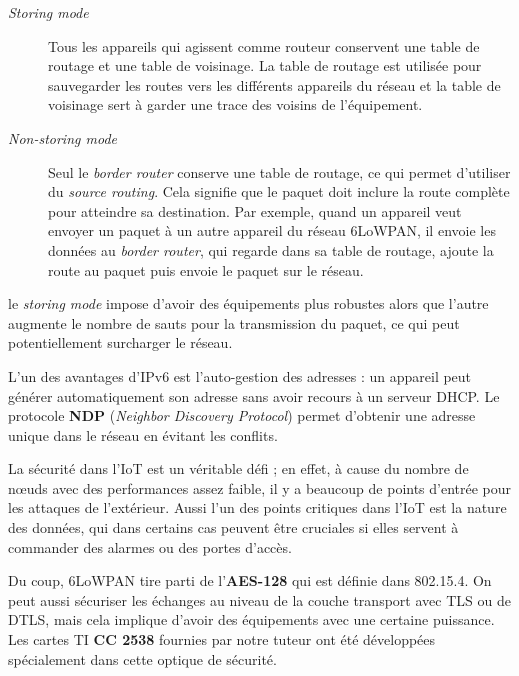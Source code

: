\begin{description}
	\item[\textit{Storing mode}] Tous les appareils qui agissent comme routeur conservent une table de routage et une table de voisinage. La table de routage est utilisée pour sauvegarder les routes vers les différents appareils du réseau et la table de voisinage sert à garder une trace des voisins de l'équipement.
	\item[\textit{Non-storing mode}] Seul le \textit{border router} conserve une table de routage, ce qui permet d'utiliser du \textit{source routing}. Cela signifie que le paquet doit inclure la route complète pour atteindre sa destination. Par exemple, quand un appareil veut envoyer un paquet à un autre appareil du réseau 6LoWPAN, il envoie les données au \textit{border router}, qui regarde dans sa table de routage, ajoute la route au paquet puis envoie le paquet sur le réseau.
\end{description}

le \textit{storing mode} impose d'avoir des équipements plus robustes alors que l'autre augmente le nombre de sauts pour la transmission du paquet, ce qui peut potentiellement surcharger le réseau.

L'un des avantages d'IPv6 est l'auto-gestion des adresses : un appareil peut générer automatiquement son adresse sans avoir recours à un serveur DHCP. Le protocole \textbf{NDP} (\textit{Neighbor Discovery Protocol}) permet d'obtenir une adresse unique dans le réseau en évitant les conflits.

La sécurité dans l'IoT est un véritable défi ; en effet, à cause du nombre de nœuds avec des performances assez faible, il y a beaucoup de points d'entrée pour les attaques de l'extérieur. Aussi l'un des points critiques dans l'IoT est la nature des données, qui dans certains cas peuvent être cruciales si elles servent à commander des alarmes ou des portes d'accès.

Du coup, 6LoWPAN tire parti de l'\textbf{AES-128} qui est définie dans 802.15.4. On peut aussi sécuriser les échanges au niveau de la couche transport avec TLS ou de DTLS, mais cela implique d'avoir des équipements avec une certaine puissance. Les cartes TI \textbf{CC 2538} fournies par notre tuteur ont été développées spécialement dans cette optique de sécurité.
